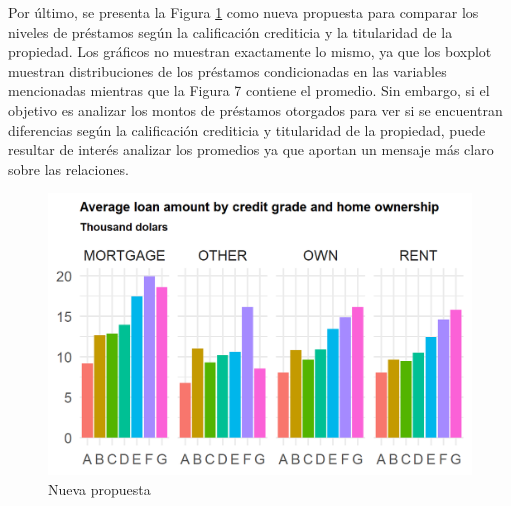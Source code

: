 \documentclass[10.5pt]{article}   %
\begin{document}
Por último, se presenta la Figura \ref{fig7} como nueva propuesta para comparar los niveles de préstamos según la calificación crediticia y la titularidad de la propiedad. Los gráficos no muestran exactamente lo mismo, ya que los boxplot muestran distribuciones de los préstamos condicionadas en las variables mencionadas mientras que la Figura 7 contiene el promedio. Sin embargo, si el objetivo es analizar los montos de préstamos otorgados para ver si se encuentran diferencias según la calificación crediticia y titularidad de la propiedad, puede resultar de interés analizar los promedios ya que aportan un mensaje más claro sobre las relaciones.
\begin{figure}[H]
\centering
\includegraphics[scale=1.2]{imgs/loans3.png}
\caption{Nueva propuesta}
    \label{fig7}
\end{figure}
\end{document}
